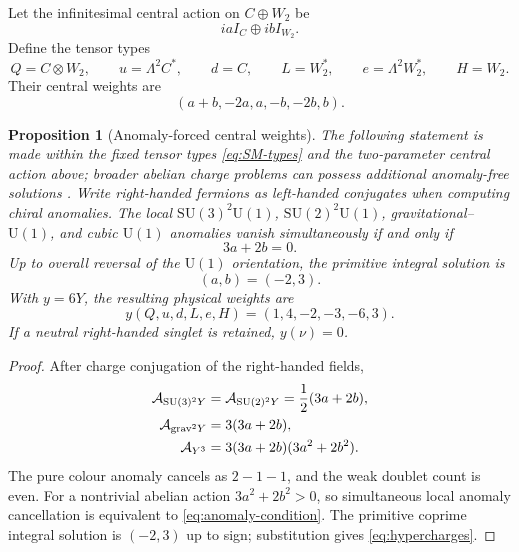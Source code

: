 \documentclass[11pt]{article}
\numberwithin{equation}{section}
\newtheorem{proposition}[theorem]{Proposition}
\theoremstyle{definition}
\theoremstyle{remark}
\newcommand{\U}{\mathrm U}
\newcommand{\SU}{\mathrm{SU}}
\begin{document}
Let the infinitesimal central action on $C\oplus W_2$ be
\[
iaI_C\oplus ibI_{W_2}.
\]
Define the tensor types
\begin{equation}
Q=C\otimes W_2,\qquad
u=\Lambda^2C^*,\qquad
d=C,\qquad
L=W_2^*,\qquad
e=\Lambda^2W_2^*,\qquad
H=W_2.
\label{eq:SM-types}
\end{equation}
Their central weights are
\begin{equation}
(a+b,-2a,a,-b,-2b,b).
\label{eq:central-weights}
\end{equation}

\begin{proposition}[Anomaly-forced central weights]
\label{thm:hypercharge}
The following statement is made within the fixed tensor types
\eqref{eq:SM-types} and the two-parameter central action above; broader
abelian charge problems can possess additional anomaly-free solutions
\cite{GripaiosNguyen2026}.  Write right-handed fermions as left-handed
conjugates when computing chiral anomalies.  The local
$\SU(3)^2\U(1)$,
$\SU(2)^2\U(1)$,
gravitational--$\U(1)$,
and cubic $\U(1)$ anomalies vanish simultaneously if and only if
\begin{equation}
3a+2b=0.
\label{eq:anomaly-condition}
\end{equation}
Up to overall reversal of the $\U(1)$ orientation, the primitive integral
solution is
\[
(a,b)=(-2,3).
\]
With $y=6Y$, the resulting physical weights are
\begin{equation}
y(Q,u,d,L,e,H)=(1,4,-2,-3,-6,3).
\label{eq:hypercharges}
\end{equation}
If a neutral right-handed singlet is retained, $y(\nu)=0$.
\end{proposition}

\begin{proof}
After charge conjugation of the right-handed fields,
\begin{align*}
\mathcal A_{\SU(3)^2Y}
&=
\mathcal A_{\SU(2)^2Y}
=
\frac12(3a+2b),\\
\mathcal A_{{\rm grav}^2Y}
&=
3(3a+2b),\\
\mathcal A_{Y^3}
&=
3(3a+2b)(3a^2+2b^2).
\end{align*}
The pure colour anomaly cancels as $2-1-1$, and the weak doublet count is even.
For a nontrivial abelian action $3a^2+2b^2>0$, so simultaneous local anomaly
cancellation is equivalent to \eqref{eq:anomaly-condition}.  The primitive
coprime integral solution is $(-2,3)$ up to sign; substitution gives
\eqref{eq:hypercharges}.
\end{proof}
\end{document}
